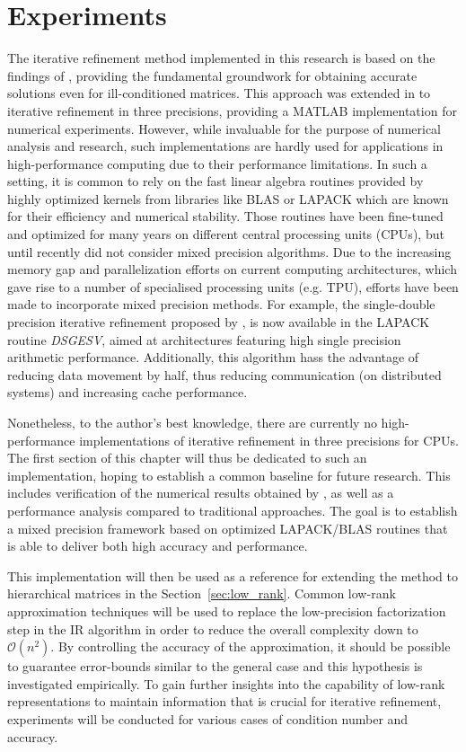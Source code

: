 \chapter{Experiments}
\label{chap:experiments}

The iterative refinement method implemented in this research is based on the findings of \cite{carson_new_2017}, providing the fundamental groundwork for obtaining accurate solutions even for ill-conditioned matrices. This approach was extended in \cite{carson_accelerating_2018} to iterative refinement in three precisions, providing a MATLAB implementation for numerical experiments. However, while invaluable for the purpose of numerical analysis and research, such implementations are hardly used for applications in high-performance computing due to their performance limitations. In such a setting, it is common to rely on the fast linear algebra routines provided by highly optimized kernels from libraries like BLAS or LAPACK which are known for their efficiency and numerical stability. Those routines have been fine-tuned and optimized for many years on different central processing units (CPUs), but until recently did not consider mixed precision algorithms. Due to the increasing memory gap and parallelization efforts on current computing architectures, which gave rise to a number of specialised processing units (e.g. TPU), efforts have been made to incorporate mixed precision methods. For example, the single-double precision iterative refinement proposed by \cite{langou_exploiting_2006}, is now available in the LAPACK routine \textit{DSGESV}, aimed at architectures featuring high single precision arithmetic performance. Additionally, this  algorithm hass the advantage of reducing data movement by half, thus reducing communication (on distributed systems) and increasing cache performance. 

Nonetheless, to the author's best knowledge, there  are currently no high-performance implementations of iterative refinement in three precisions for CPUs. The first section of this chapter will thus be dedicated to such an implementation, hoping to establish a common baseline for future research. This includes verification of the numerical results obtained by \cite{carson_accelerating_2018}, as well as a performance analysis compared to traditional approaches. The goal is to establish a mixed precision framework based on optimized LAPACK/BLAS routines that is able to deliver both high accuracy and performance.

This implementation will then be used as a reference for extending the method to hierarchical matrices in the Section~\hyperref[sec:low_rank]{\ref{sec:low_rank}}. Common low-rank approximation techniques will be used to replace the low-precision factorization step in the IR algorithm in order to reduce the overall complexity down to $\mathcal{O}(n^2)$. By controlling the accuracy of the approximation, it should be possible to guarantee error-bounds similar to the general case and this hypothesis is investigated empirically. To gain further insights into the capability of low-rank representations to maintain information that is crucial for iterative refinement, experiments will be conducted for various cases of condition number and accuracy.

